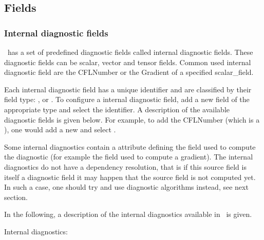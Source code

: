 \subsection{Fields}
\label{sec:diagnostics_fields}

\subsubsection{Internal diagnostic fields}\label{sec:Internal_diagnostic_fields}
\fluidity\ has a set of predefined diagnostic fields called internal diagnostic fields. These diagnostic fields can be scalar, vector and tensor fields. Common used internal diagnostic field are the CFLNumber or the Gradient of a specified scalar\_field.


Each internal diagnostic field has a unique identifier and are classified by their field type: , 
or . To configure a internal diagnostic field, add a new field of the appropriate type and select the identifier. A description of the available diagnostic fields is given below. For example, to add the CFLNumber (which is a ), one would add a new  and select .

Some internal diagnostics contain a 
attribute defining the field used to compute the diagnostic (for example the
field used to compute a gradient). The internal diagnostics do not have a dependency resolution, that is if this source field is itself a diagnostic
field it may happen that the source field is not computed yet. In such a case, one should try and use diagnostic algorithms instead, see next section.

In the following, a description of the internal diagnostics available in \fluidity\ is given.

Internal  diagnostics:

